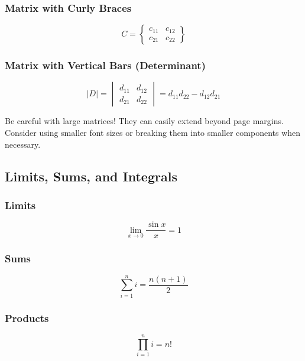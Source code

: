 \documentclass[11pt,a4paper]{article}
\begin{document}
\subsubsection{Matrix with Curly Braces}
\begin{equation}
    C = 
    \begin{Bmatrix}
        c_{11} & c_{12} \\
        c_{21} & c_{22}
    \end{Bmatrix}
\end{equation}

\subsubsection{Matrix with Vertical Bars (Determinant)}
\begin{equation}
    |D| = 
    \begin{vmatrix}
        d_{11} & d_{12} \\
        d_{21} & d_{22}
    \end{vmatrix}
    = d_{11}d_{22} - d_{12}d_{21}
\end{equation}

\begin{warningbox}
Be careful with large matrices! They can easily extend beyond page margins. Consider using smaller font sizes or breaking them into smaller components when necessary.
\end{warningbox}

\subsection{Limits, Sums, and Integrals}

\subsubsection{Limits}
\begin{equation}
    \lim_{x \to 0} \frac{\sin x}{x} = 1
\end{equation}

\subsubsection{Sums}
\begin{equation}
    \sum_{i=1}^{n} i = \frac{n(n+1)}{2}
\end{equation}

\subsubsection{Products}
\begin{equation}
    \prod_{i=1}^{n} i = n!
\end{equation}
\end{document}
